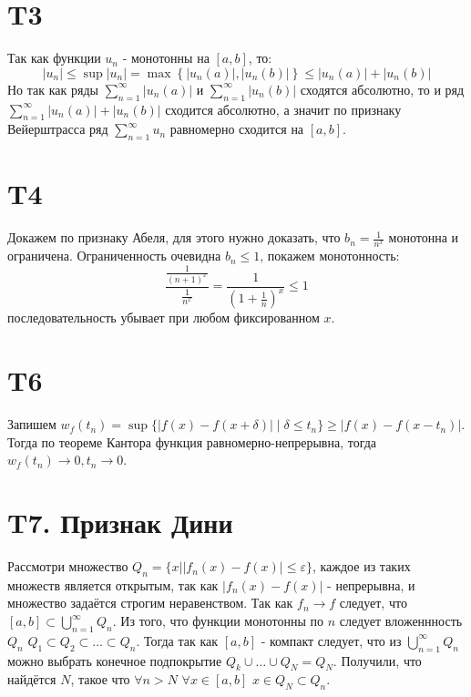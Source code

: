\documentclass[12pt]{article}
\begin{document}
\section{T3}
Так как функции $u_n$ - монотонны на $[a, b]$, то:
\[
    \left\vert u_n \right\vert \leq \sup \left\vert u_n \right\vert = \max \left\{ \left\vert u_n(a) \right\vert , \left\vert u_n(b) \right\vert  \right\} \leq
    \left\vert u_n(a) \right\vert + \left\vert u_n(b) \right\vert
\]
Но так как ряды $\sum_{n=1}^{\infty} \left\vert u_n(a) \right\vert$ и $\sum_{n=1}^{\infty} \left\vert u_n(b) \right\vert$ сходятся абсолютно, то
и ряд $\sum_{n=1}^{\infty} \left\vert u_n(a) \right\vert + \left\vert u_n(b) \right\vert$ сходится абсолютно, а значит по признаку
Вейерштрасса ряд $\sum_{n=1}^{\infty} u_n$ равномерно сходится на $[a, b]$.

\section{T4}
Докажем по признаку Абеля, для этого нужно доказать, что $b_n = \frac{1}{n^x}$ монотонна и ограничена.
Ограниченность очевидна $b_n \leq 1$, покажем монотонность:
\[
    \frac{\frac{1}{(n+1)^x}}{\frac{1}{n^x}} = \frac{1}{\left( 1 + \frac{1}{n} \right)^x } \leq 1
\]
последовательность убывает при любом фиксированном $x$.

\section{T6}
Запишем $w_f(t_n) = \sup \{\vert f(x) - f(x + \delta ) \vert \mid \delta \leq  t_n\} \geq \vert f(x) - f(x - t_n) \vert $.
Тогда по теореме Кантора функция равномерно-непрерывна, тогда $w_f(t_n) \to 0, t_n \to 0$.
\section{T7. Признак Дини}
Рассмотри множество $Q_n = \{x \mid \vert f_n(x) - f(x) \vert \leq \varepsilon\}$,
каждое из таких множеств является открытым, так как $\vert f_n(x) - f(x) \vert$ - непрерывна, и
множество задаётся строгим неравенством. Так как $f_n \to f$ следует, что $[a, b] \subset \bigcup_{n=1}^{\infty} Q_n$.
Из того, что функции монотонны по $n$ следует вложеннность $Q_n$ $Q_1 \subset Q_2 \subset \dots \subset Q_n$.
Тогда так как $[a, b]$ - компакт следует, что из $\bigcup_{n=1}^{\infty} Q_n$ можно выбрать конечное подпокрытие
$Q_k \cup \dots \cup Q_N = Q_N$. Получили, что найдётся $N$, такое что $\forall n > N$ $\forall x \in [a, b]$ $x \in Q_N \subset Q_n$.
\end{document}
